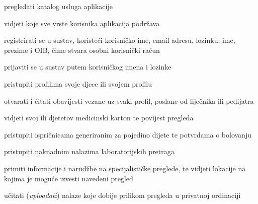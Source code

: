 			
			\begin{packed_enum}
				\item  {}
				
				\begin{packed_enum}
					
					\item pregledati katalog usluga aplikacije
					\item vidjeti koje sve vrste korisnika aplikacija podržava
					\item registrirati se u sustav, koristeći korisničko ime, email adresu, lozinku, ime, prezime i OIB, čime stvara osobni korisnički račun
					\item prijaviti se u sustav putem korisničkog imena i lozinke
					
				\end{packed_enum}
			
				\item  {}
				
				\begin{packed_enum}
					
					\item pristupiti profilima svoje djece ili svojem profilu
					\item otvarati i čitati obavijesti vezane uz svaki profil, poslane od liječnika ili pedijatra
					\item vidjeti svoj ili djetetov medicinski karton te povijest pregleda
					\item pristupiti ispričnicama generiranim za pojedino dijete te potvrdama o bolovanju
					\item pristupiti naknadnim nalazima laboratorijskih pretraga
					\item primiti informacije i narudžbe na specijalističke preglede, te vidjeti lokacije na kojima je moguće izvesti navedeni pregled
					\item učitati (\textit{uploadati}) nalaze koje dobije prilikom pregleda u privatnoj ordinaciji
					
				\end{packed_enum}
				
				\item  {}
				
				\begin{packed_enum}
					

\end{packed_enum}
\end{packed_enum}

